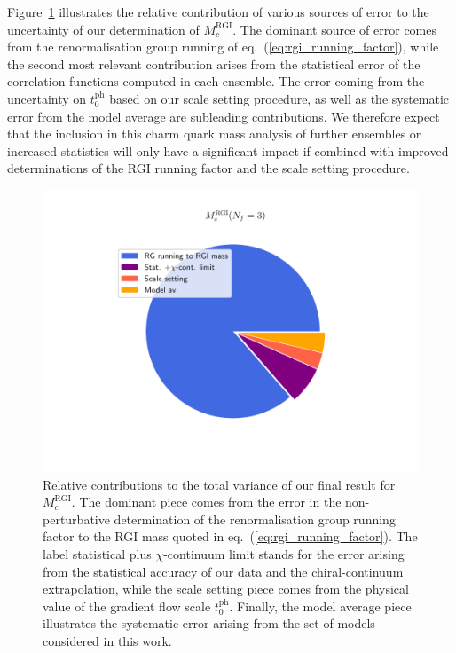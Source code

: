 Figure~\ref{fig:mc_error_contributions} illustrates the relative contribution of various sources of error to the
uncertainty of our determination of $M_c^{\mathrm{RGI}}$. The dominant source of error comes from the 
renormalisation group running of eq.~(\ref{eq:rgi_running_factor}), while the second most relevant 
contribution arises from the statistical error of  the correlation functions computed in each ensemble.  
The  error coming from  the uncertainty on $t_0^{\mathrm{ph}}$ based on our  scale setting  procedure, as well as the 
systematic error from the model average  are subleading contributions. We therefore expect
that the 
inclusion in this charm quark mass analysis of further ensembles or increased statistics will only have a significant impact if combined with improved determinations of the RGI running factor and the scale setting procedure.
%
\begin{figure}
	\centering
	\includegraphics[scale=0.5]{./cap6/figs/mc/mc_error_pie.pdf}
	\caption{Relative contributions to the total variance of our final result for $M_c^{\mathrm{RGI}}$. The dominant piece comes from the error in the non-perturbative determination of the renormalisation group running factor to the RGI mass quoted in eq.~(\ref{eq:rgi_running_factor}). The label statistical plus $\chi$-continuum limit stands for the error arising from the statistical accuracy of our data and the chiral-continuum extrapolation, while the scale setting piece comes from the physical value of the gradient flow scale $t_0^{\mathrm{ph}}$. Finally, the model average piece illustrates the systematic error arising from the set of models considered in this work.
          }
	\label{fig:mc_error_contributions}
\end{figure}
%

